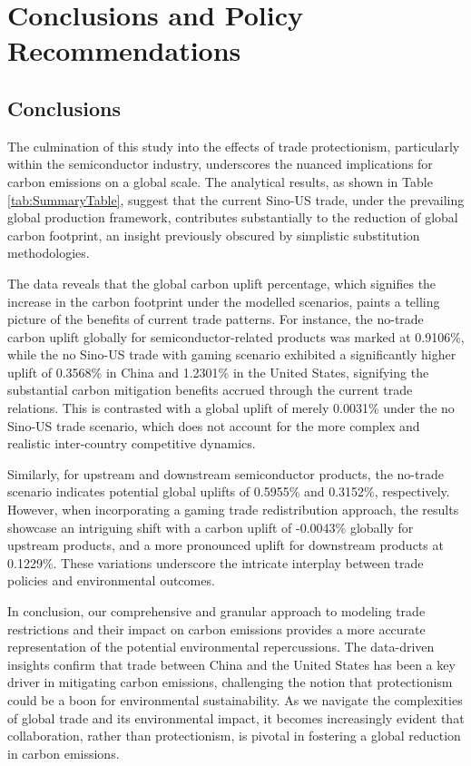 \chapter{Conclusions and Policy Recommendations}
\section{Conclusions}


The culmination of this study into the effects of trade protectionism, particularly within the semiconductor industry, underscores the nuanced implications for carbon emissions on a global scale. The analytical results, as shown in Table \ref{tab:SummaryTable}, suggest that the current Sino-US trade, under the prevailing global production framework, contributes substantially to the reduction of global carbon footprint, an insight previously obscured by simplistic substitution methodologies.

The data reveals that the global carbon uplift percentage, which signifies the increase in the carbon footprint under the modelled scenarios, paints a telling picture of the benefits of current trade patterns. For instance, the no-trade carbon uplift globally for semiconductor-related products was marked at 0.9106\%, while the no Sino-US trade with gaming scenario exhibited a significantly higher uplift of 0.3568\% in China and 1.2301\% in the United States, signifying the substantial carbon mitigation benefits accrued through the current trade relations. This is contrasted with a global uplift of merely 0.0031\% under the no Sino-US trade scenario, which does not account for the more complex and realistic inter-country competitive dynamics.

Similarly, for upstream and downstream semiconductor products, the no-trade scenario indicates potential global uplifts of 0.5955\% and 0.3152\%, respectively. However, when incorporating a gaming trade redistribution approach, the results showcase an intriguing shift with a carbon uplift of -0.0043\% globally for upstream products, and a more pronounced uplift for downstream products at 0.1229\%. These variations underscore the intricate interplay between trade policies and environmental outcomes.

In conclusion, our comprehensive and granular approach to modeling trade restrictions and their impact on carbon emissions provides a more accurate representation of the potential environmental repercussions. The data-driven insights confirm that trade between China and the United States has been a key driver in mitigating carbon emissions, challenging the notion that protectionism could be a boon for environmental sustainability. As we navigate the complexities of global trade and its environmental impact, it becomes increasingly evident that collaboration, rather than protectionism, is pivotal in fostering a global reduction in carbon emissions.







